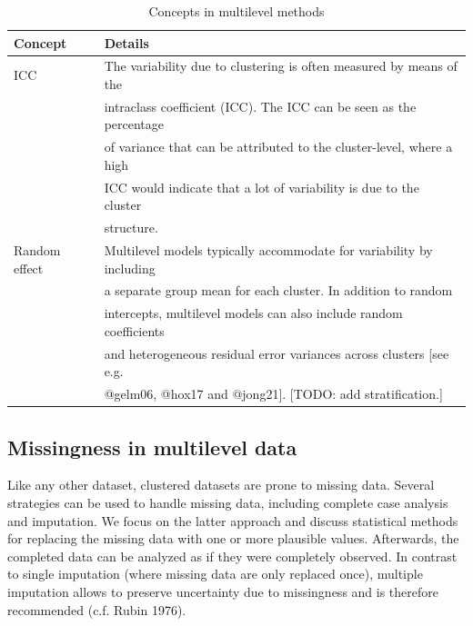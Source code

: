 \documentclass[
]{jss}
\begin{document}
\begin{table}[tb]
\caption{Concepts in multilevel methods}
\label{tab:clus}
\centering
\begin{tabular}{ll}
\hline
\textbf{Concept} & \textbf{Details}   \\
\hline
ICC                 & The variability due to clustering is often measured by means of the \\
                    & intraclass coefficient (ICC). The ICC can be seen as the percentage \\
                    & of variance that can be attributed to the cluster-level, where a high \\
                    & ICC would indicate that a lot of variability is due to the cluster \\
                    & structure. \\
Random effect       & Multilevel models typically accommodate for variability by including \\
                    & a separate group mean for each cluster. In addition to random \\
                    & intercepts, multilevel models can also include random coefficients \\
                    & and heterogeneous residual error variances across clusters [see e.g. \\
                    & @gelm06, @hox17 and @jong21]. [TODO: add stratification.] \\
\hline
\end{tabular}
\end{table}

\hypertarget{missingness-in-multilevel-data}{%
\subsection{Missingness in multilevel
data}\label{missingness-in-multilevel-data}}

Like any other dataset, clustered datasets are prone to missing data.
Several strategies can be used to handle missing data, including
complete case analysis and imputation. We focus on the latter approach
and discuss statistical methods for replacing the missing data with one
or more plausible values. Afterwards, the completed data can be analyzed
as if they were completely observed. In contrast to single imputation
(where missing data are only replaced once), multiple imputation allows
to preserve uncertainty due to missingness and is therefore recommended
(c.f. Rubin 1976).
\end{document}
